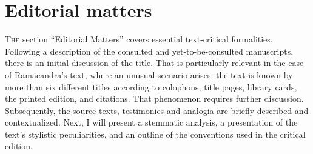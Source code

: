 \section{Editorial matters}

\lettrine[lines=2, lhang=0.2, loversize=0.25]{T}{he} section ``Editorial Matters'' covers essential text-critical formalities. Following a description of the consulted and yet-to-be-consulted manuscripts, there is an initial discussion of the title. That is particularly relevant in the case of Rāmacandra's text, where an unusual scenario arises: the text is known by more than six different titles according to colophons, title pages, library cards, the printed edition, and citations. That phenomenon requires further discussion. Subsequently, the source texts, testimonies and analogia are briefly described and contextualized. Next, I will present a stemmatic analysis, a presentation of the text's stylistic peculiarities, and an outline of the conventions used in the critical edition.

